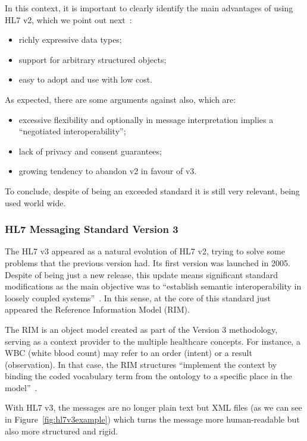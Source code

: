 In this context, it is important to clearly identify the main advantages of using HL7 v2, which we point out next~\citep{Atalag2010}:
\begin{itemize}
\item richly expressive data types;
\item support for arbitrary structured objects;
\item easy to adopt and use with low cost.
\end{itemize}

As expected, there are some arguments against also, which are:
\begin{itemize}
\item excessive flexibility and optionally in message interpretation implies a  ``negotiated interoperability'';
\item lack of privacy and consent guarantees;
\item growing tendency to abandon v2 in favour of v3. 
\end{itemize}

To conclude, despite of being an exceeded standard it is still very relevant, being used world wide. 

\subsubsection{HL7 Messaging Standard Version 3}

The HL7 v3 appeared as a natural evolution of HL7 v2, trying to solve some problems that the previous version had. Its first version was launched in 2005. Despite of being just a new release, this update means significant standard modifications as the main objective was to ``establish semantic interoperability in loosely coupled systems''~\citep{Atalag2010}. In this sense, at the core of this standard just appeared the Reference Information Model (RIM).

The RIM is an object model created as part of the Version 3 methodology, serving as a context provider to the multiple healthcare concepts. For instance, a WBC (white blood count) may refer to an order (intent) or a result (observation). In that case, the RIM structures ``implement the context by binding the coded vocabulary term from the ontology to a specific place in the model''~\citep{Shafarman2004}.

With HL7 v3, the messages are no longer plain text but XML files (as we can see in Figure~\ref{fig:hl7v3example}) which turns the message more human-readable but also more structured and rigid.

